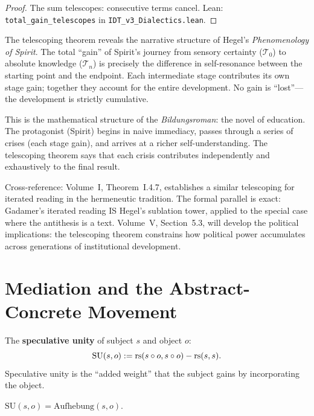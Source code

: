 \begin{proof}
The sum telescopes: consecutive terms cancel.
Lean: \texttt{total\_gain\_telescopes} in \texttt{IDT\_v3\_Dialectics.lean}.
\end{proof}

\begin{interpretation}
The telescoping theorem reveals the narrative structure of Hegel's
\textit{Phenomenology of Spirit}. The total ``gain'' of Spirit's journey
from sensory certainty ($\mathcal{T}_0$) to absolute knowledge
($\mathcal{T}_n$) is precisely the difference in self-resonance between the
starting point and the endpoint. Each intermediate stage contributes its own
stage gain; together they account for the entire development. No gain is
``lost''---the development is strictly cumulative.

This is the mathematical structure of the \textit{Bildungsroman}: the novel
of education. The protagonist (Spirit) begins in naive immediacy, passes
through a series of crises (each stage gain), and arrives at a richer
self-understanding. The telescoping theorem says that each crisis contributes
independently and exhaustively to the final result.

Cross-reference: Volume~I, Theorem~I.4.7, establishes a similar telescoping
for iterated reading in the hermeneutic tradition. The formal parallel is
exact: Gadamer's iterated reading IS Hegel's sublation tower, applied to the
special case where the antithesis is a text. Volume~V, Section~5.3, will
develop the political implications: the telescoping theorem constrains how
political power accumulates across generations of institutional development.
\end{interpretation}

\section{Mediation and the Abstract-Concrete Movement}

\begin{definition}
\label{def:speculative-unity}
The \textbf{speculative unity} of subject $s$ and object $o$:
\[
\mathrm{SU}(s, o) := \mathrm{rs}(s \circ o, s \circ o) - \mathrm{rs}(s, s).
\]
Speculative unity is the ``added weight'' that the subject gains by
incorporating the object.
\end{definition}

\begin{theorem}
\label{thm:speculative-aufhebung}
$\mathrm{SU}(s, o) = \mathrm{Aufhebung}(s, o)$.
\end{theorem}

